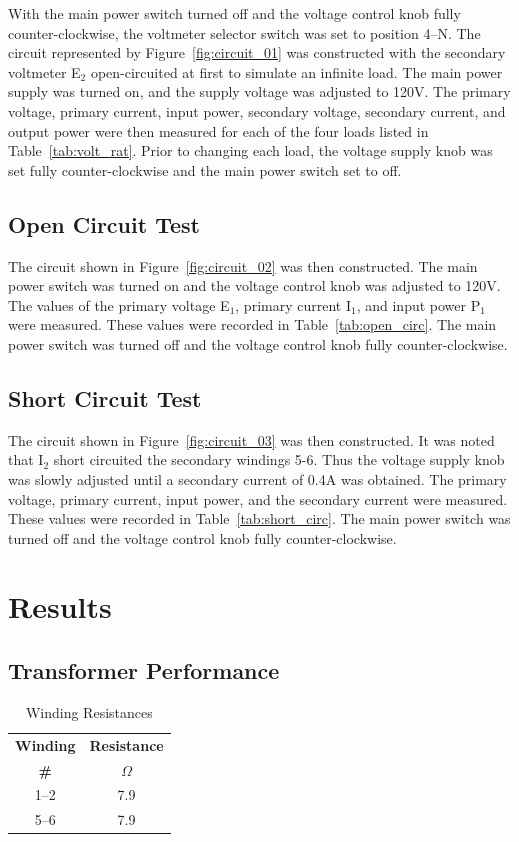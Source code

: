 \documentclass{article}
\begin{document}
\label{part1} With the main power switch turned off and the voltage control
knob fully counter-clockwise, the voltmeter selector switch was set to position
4--N. The circuit represented by Figure~\ref{fig:circuit_01} was constructed
with the secondary voltmeter E$_2$ open-circuited at first to simulate an
infinite load.  The main power supply was turned on, and the supply voltage was
adjusted to 120V. The primary voltage, primary current, input power, secondary
voltage, secondary current, and output power were then measured for each of the
four loads listed in Table~\ref{tab:volt_rat}.  Prior to changing each load,
the voltage supply knob was set fully counter-clockwise and the main power
switch set to off.

\subsection{Open Circuit Test}

\label{part2} The circuit shown in Figure~\ref{fig:circuit_02} was then constructed. The main power switch
was turned on and the voltage control knob was adjusted to 120V. The values of the primary voltage E$_1$, primary
current I$_1$, and input power P$_1$ were measured. These values were recorded in Table~\ref{tab:open_circ}.
The main power switch was turned off and the voltage control knob fully counter-clockwise.

\subsection{Short Circuit Test}

\label{part3} The circuit shown in Figure~\ref{fig:circuit_03} was then constructed. It was noted that
I$_2$ short circuited the secondary windings 5-6. Thus the voltage supply knob was slowly adjusted until
a secondary current of 0.4A was obtained. The primary voltage, primary current, input power, and the
secondary current were measured. These values were recorded in Table~\ref{tab:short_circ}.
The main power switch was turned off and the voltage control knob fully counter-clockwise.

\section{Results}
\subsection{Transformer Performance}
\begin{table}[H]
  \centering
  \begin{tabular}{*{2}{c}}
    \textbf{Winding} & \textbf{Resistance} \\
    \textbf{\#} & $\Omega$ \\
    \hline
    1--2 &  7.9 \\
    5--6 &  7.9 \\
  \end{tabular}
  \caption{Winding Resistances}
  \label{tab:wind_res}
\end{table}
\end{document}
